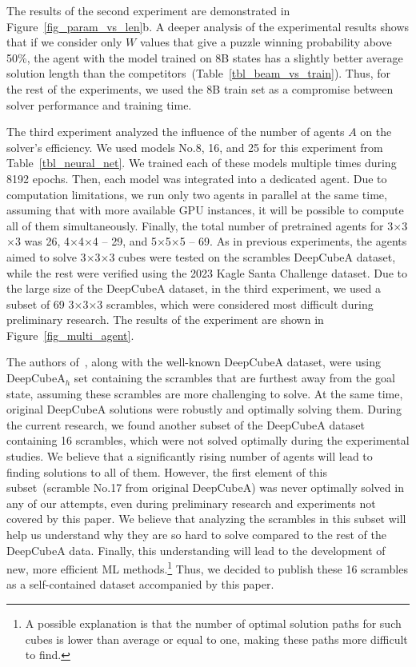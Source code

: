 The results of the second experiment are demonstrated in Figure~\ref{fig_param_vs_len}b. A deeper analysis of the experimental results shows that if we consider only $W$ values that give a puzzle winning probability above 50\%, the agent with the model trained on 8B states has a slightly better average solution length than the competitors~(Table~\ref{tbl_beam_vs_train}). Thus, for the rest of the experiments, we used the 8B train set as a compromise between solver performance and training time. 


The third experiment analyzed the influence of the number of agents $A$ on the solver's efficiency. We used models No.8, 16, and 25 for this experiment from Table~\ref{tbl_neural_net}. We trained each of these models multiple times during 8192 epochs. Then, each model was integrated into a dedicated agent. Due to computation limitations, we run only two agents in parallel at the same time, assuming that with more available GPU instances, it will be possible to compute all of them simultaneously. Finally, the total number of pretrained agents for 3$\times$3$\times$3 was 26, 4$\times$4$\times$4 -- 29, and 5$\times$5$\times$5 -- 69. As in previous experiments, the agents aimed to solve 3$\times$3$\times$3 cubes were tested on the scrambles DeepCubeA dataset, while the rest were verified using the 2023 Kagle Santa Challenge dataset. Due to the large size of the DeepCubeA dataset, in the third experiment, we used a subset of 69 3$\times$3$\times$3 scrambles, which were considered most difficult during preliminary research. The results of the experiment are shown in Figure~\ref{fig_multi_agent}.

The authors of~\cite{agostinelli2019solving}, along with the well-known DeepCubeA dataset, were using DeepCubeA$_h$ set containing the scrambles that are furthest away from the goal state, assuming these scrambles are more challenging to solve. At the same time, original DeepCubeA solutions were robustly and optimally solving them. During the current research, we found another subset of the DeepCubeA dataset containing 16 scrambles, which were not solved optimally during the experimental studies. We believe that a significantly rising number of agents will lead to finding solutions to all of them. However, the first element of this subset~(scramble No.17 from original DeepCubeA) was never optimally solved in any of our attempts, even during preliminary research and experiments not covered by this paper. We believe that analyzing the scrambles in this subset will help us understand why they are so hard to solve compared to the rest of the DeepCubeA data. Finally, this understanding will lead to the development of new, more efficient ML methods.\footnote{A possible explanation is that the number of optimal solution paths for such cubes is lower than average or equal to one, making these paths more difficult to find.} Thus, we decided to publish these 16 scrambles as a self-contained dataset accompanied by this paper.

